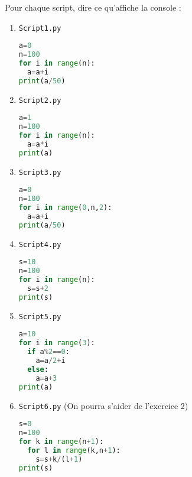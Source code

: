 \documentclass[a4paper, 11pt,reqno]{article}
\begin{document}
\begin{exercice}
Pour chaque script, dire ce qu'affiche la console : 


\begin{minipage}{0.45\textwidth}   %
\begin{enumerate}
\item  \texttt{Script1.py}

\begin{lstlisting}[language=Python]
a=0
n=100
for i in range(n):
  a=a+i
print(a/50)
\end{lstlisting}

\vspace{1cm}


\item \texttt{Script2.py}
\begin{lstlisting}[language=Python]
a=1
n=100
for i in range(n):
  a=a*i
print(a)
\end{lstlisting}



\vspace{1cm}
\item \texttt{Script3.py}
\begin{lstlisting}[language=Python]
a=0
n=100
for i in range(0,n,2):
  a=a+i
print(a/50)
\end{lstlisting}


\end{enumerate}
\end{minipage}
\hfill\vline\hfill
\begin{minipage}{0.44\textwidth} %

\begin{enumerate} \setcounter{enumi}{3}
\item \texttt{Script4.py}
\begin{lstlisting}[language=Python]
s=10
n=100
for i in range(n):
  s=s+2
print(s)
\end{lstlisting}
\vspace{0.4cm}
 \item \texttt{Script5.py}
\begin{lstlisting}[language=Python]
a=10
for i in range(3):
  if a%2==0:
    a=a/2+i
  else:
    a=a+3
print(a)
\end{lstlisting}
\vspace{0.4cm}
\item \texttt{Script6.py} (On pourra s'aider de l'exercice 2) 
\begin{lstlisting}[language=Python]
s=0
n=100
for k in range(n+1):
  for l in range(k,n+1):
    s=s+k/(l+1)
print(s)
\end{lstlisting}


\end{enumerate}
\end{minipage}

\end{exercice}
\end{document}
